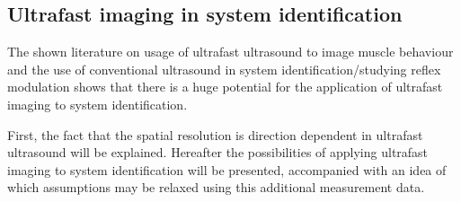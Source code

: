 


\subsection{Ultrafast imaging in system identification}
\label{sec:ufus_disc_sys_id}

The shown literature on usage of ultrafast ultrasound to image muscle behaviour and the use of conventional ultrasound in system identification/studying reflex modulation shows that there is a huge potential for the application of ultrafast imaging to system identification. 

First, the fact that the spatial resolution is direction dependent in ultrafast ultrasound will be explained. Hereafter the possibilities of applying ultrafast imaging to system identification will be presented, accompanied with an idea of which assumptions may be relaxed using this additional measurement data.

% 

